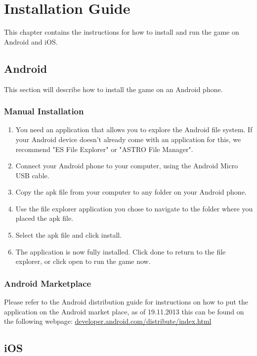 \chapter{Installation Guide}

This chapter contains the instructions for how to install and run the game on 
Android and iOS.

\section{Android}

This section will describe how to install the game on an Android phone.

\subsection*{Manual Installation}
\begin{enumerate}

	\item{} You need an application that allows you to explore the Android file
	system. If your Android device doesn't already come with an application for
	this, we recommend "ES File Explorer" or "ASTRO File Manager".

	\item{} Connect your Android phone to your computer, using the Android Micro
	USB cable.

	\item{} Copy the apk file from your computer to any folder on your Android 
	phone.

	\item{} Use the file explorer application you chose to navigate to the folder 
	where you placed the apk file.

	\item{} Select the apk file and click install.

	\item{} The application is now fully installed. Click done to return to the 
	file explorer, or click open to run the game now.

\end{enumerate}

\subsection*{Android Marketplace}
Please refer to the Android distribution guide for instructions on how to put 
the application on the Android market place, as of 19.11.2013 this can be found 
on the following webpage: \href{http://developer.android.com/distribute/index.h //
tml}{developer.android.com/distribute/index.html}

\section{iOS}
